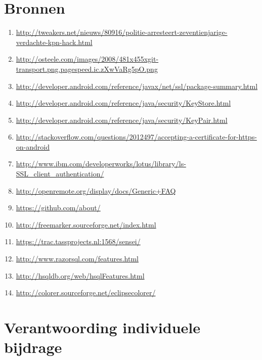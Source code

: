 \documentclass[]{article}
\begin{document}
\newpage
\section{Bronnen}

\begin{enumerate}

    \item \url{http://tweakers.net/nieuws/80916/politie-arresteert-zeventienjarige-verdachte-kpn-hack.html}
    \item \url{http://osteele.com/images/2008/481x455xgit-transport.png.pagespeed.ic.zXwVaRg5pO.png}
    \item \url{http://developer.android.com/reference/javax/net/ssl/package-summary.html}
    \item \url{http://developer.android.com/reference/java/security/KeyStore.html}
    \item \url{http://developer.android.com/reference/java/security/KeyPair.html}
    \item \url{http://stackoverflow.com/questions/2012497/accepting-a-certificate-for-https-on-android}
    \item \url{http://www.ibm.com/developerworks/lotus/library/ls-SSL_client_authentication/}
    \item \url{http://openremote.org/display/docs/Generic+FAQ}
    \item \url{https://github.com/about/}
    \item \url{http://freemarker.sourceforge.net/index.html}
    \item \url{https://trac.tassprojects.nl:1568/sensei/}
    \item \url{http://www.razorsql.com/features.html}
    \item \url{http://hsqldb.org/web/hsqlFeatures.html}
    \item \url{http://colorer.sourceforge.net/eclipsecolorer/}

\end{enumerate}

\newpage
\section{Verantwoording individuele bijdrage}
\label{lastpage}
\end{document}
